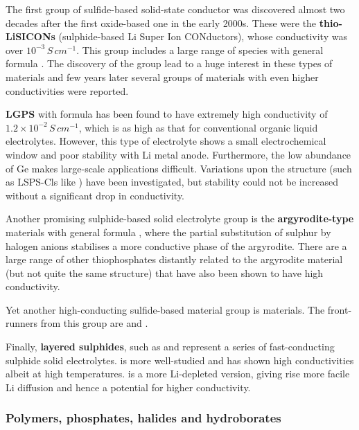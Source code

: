 \documentclass[10pt,a4paper, titlepage]{article}
\begin{document}
The first group of sulfide-based solid-state conductor was discovered almost two decades after the first oxide-based one in the early 2000s. 
These were the \textbf{thio-LiSICONs} (sulphide-based Li Super Ion CONductors), whose conductivity was over $10^{-3} \, S \, cm^{-1}$.
This group includes a large range of species with general formula .
The discovery of the group lead to a huge interest in these types of materials and few years later several groups of materials with even higher conductivities were reported.
 
\textbf{LGPS} with formula  has been found to have extremely high conductivity of $1.2 \times 10^{-2} \, S \, cm^{-1}$, which is as high as that for conventional organic liquid electrolytes. \cite{RN24}
However, this type of electrolyte shows a small electrochemical window\cite{RN25} and poor stability with Li metal anode\cite{RN26}. 
Furthermore, the low abundance of Ge makes large-scale applications difficult. \cite{RN3} 
Variations upon the structure (such as LSPS-Cls like ) have been investigated, but stability could not be increased without a significant drop in conductivity.  

Another promising sulphide-based solid electrolyte group is the \textbf{argyrodite-type} materials with general formula , where the partial substitution of sulphur by halogen anions stabilises a more conductive phase of the argyrodite. \cite{RN27}
There are a large range of other thiophosphates distantly related to the argyrodite material (but not quite the same structure) that have also been shown to have high conductivity. \cite{RN3}

Yet another high-conducting sulfide-based material group is \textbf{} materials. The front-runners from this group are  and .

Finally, \textbf{layered sulphides}, such as  and  represent a series of fast-conducting sulphide solid electrolytes. 
 is more well-studied and has shown high conductivities albeit at high temperatures. \cite{RN28}
 is a more Li-depleted version, giving rise more facile Li diffusion and hence a potential for higher conductivity.

\subsubsection{Polymers, phosphates, halides and hydroborates}
\end{document}
